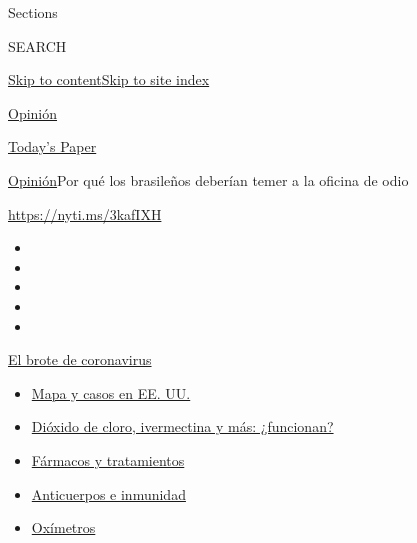 Sections

SEARCH

\protect\hyperlink{site-content}{Skip to
content}\protect\hyperlink{site-index}{Skip to site index}

\href{https://www.nytimes.com/es/section/opinion}{Opinión}

\href{https://myaccount.nytimes.com/auth/login?response_type=cookie\&client_id=vi}{}

\href{https://www.nytimes.com/section/todayspaper}{Today's Paper}

\href{/es/section/opinion}{Opinión}\textbar{}Por qué los brasileños
deberían temer a la oficina de odio

\url{https://nyti.ms/3kafIXH}

\begin{itemize}
\item
\item
\item
\item
\item
\end{itemize}

\href{https://www.nytimes.com/es/spotlight/coronavirus?action=click\&pgtype=Article\&state=default\&region=TOP_BANNER\&context=storylines_menu}{El
brote de coronavirus}

\begin{itemize}
\tightlist
\item
  \href{https://www.nytimes.com/es/interactive/2020/espanol/mundo/coronavirus-en-estados-unidos.html?action=click\&pgtype=Article\&state=default\&region=TOP_BANNER\&context=storylines_menu}{Mapa
  y casos en EE. UU.}
\item
  \href{https://www.nytimes.com/es/2020/07/23/espanol/america-latina/bolivia-cloro-coronavirus-ivermectina.html?action=click\&pgtype=Article\&state=default\&region=TOP_BANNER\&context=storylines_menu}{Dióxido
  de cloro, ivermectina y más: ¿funcionan?}
\item
  \href{https://www.nytimes.com/es/interactive/2020/science/coronavirus-tratamientos-curas.html?action=click\&pgtype=Article\&state=default\&region=TOP_BANNER\&context=storylines_menu}{Fármacos
  y tratamientos}
\item
  \href{https://www.nytimes.com/es/2020/07/28/espanol/ciencia-y-tecnologia/anticuerpos-coronavirus-inmunidad.html?action=click\&pgtype=Article\&state=default\&region=TOP_BANNER\&context=storylines_menu}{Anticuerpos
  e inmunidad}
\item
  \href{https://www.nytimes.com/es/2020/04/29/espanol/estilos-de-vida/oximetro-para-que-sirve.html?action=click\&pgtype=Article\&state=default\&region=TOP_BANNER\&context=storylines_menu}{Oxímetros}
\end{itemize}

